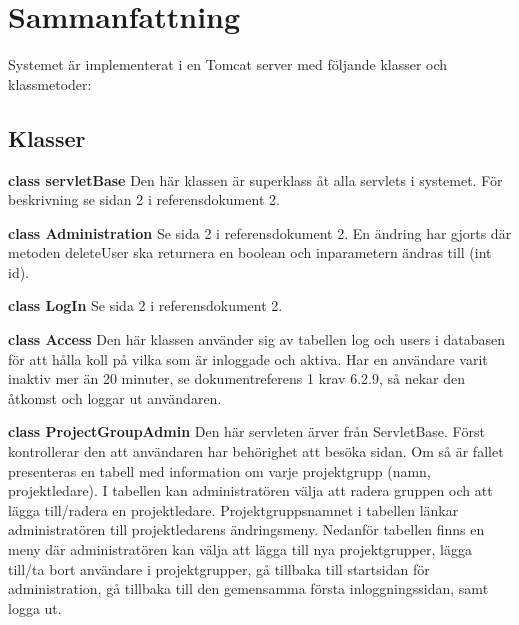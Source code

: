 \documentclass[a4paper]{article}
\begin{document}
\section{Sammanfattning}
Systemet är implementerat i en Tomcat server med följande klasser och klassmetoder:

\subsection{Klasser}
\begin{hangparas}{1.5em}{1}
\textbf{class servletBase} Den här klassen är superklass åt alla servlets i systemet. För beskrivning se sidan 2 i referensdokument 2.\end{hangparas} 

\vspace{5mm}
\begin{hangparas}{1.5em}{1}
\textbf{class Administration} Se sida 2 i referensdokument 2. En ändring har gjorts där metoden deleteUser ska returnera en boolean och inparametern ändras till (int id).\end{hangparas}

\vspace{5mm}
\begin{hangparas}{1.5em}{1}
\textbf{class LogIn} Se sida 2 i referensdokument 2.\end{hangparas}

\vspace{5mm}
\begin{hangparas}{1.5em}{1}
\textbf{class Access} Den här klassen använder sig av tabellen log och users i databasen för att hålla koll på vilka som är inloggade och aktiva. Har en användare varit inaktiv mer än 20 minuter, se dokumentreferens 1 krav 6.2.9, så nekar den åtkomst och loggar ut användaren. \end{hangparas}

\vspace{5mm}
\begin{hangparas}{1.5em}{1}
\textbf{class ProjectGroupAdmin} Den här servleten ärver från ServletBase. Först kontrollerar den att användaren har behörighet att besöka sidan. Om så är fallet presenteras en tabell med information om varje projektgrupp (namn, projektledare). I tabellen kan administratören välja att radera gruppen och att lägga till/radera en projektledare. Projektgruppsnamnet i tabellen länkar administratören till projektledarens ändringsmeny. Nedanför tabellen finns en meny där administratören kan välja att lägga till nya projektgrupper, lägga till/ta bort användare i projektgrupper, gå tillbaka till startsidan för administration, gå tillbaka till den gemensamma första inloggningssidan, samt logga ut.\end{hangparas}
\end{document}
